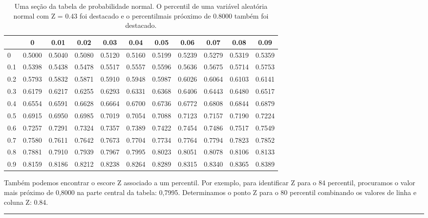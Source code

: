 \documentclass[
]{book}
\theoremstyle{definition}
\theoremstyle{definition}
\theoremstyle{definition}
\theoremstyle{definition}
\theoremstyle{remark}
\begin{document}
\begin{table}

\caption{\label{tab:zTableShort}Uma seção da tabela de probabilidade normal. O percentil de uma  variável  aleatória  normal com Z =  0.43  foi destacado e o percentilmais próoximo de 0.8000 também foi destacado.}
\centering
\begin{tabular}[t]{l|c|c|c|c|c|c|c|c|c|c}
\hline
  & 0 & 0.01 & 0.02 & 0.03 & 0.04 & 0.05 & 0.06 & 0.07 & 0.08 & 0.09\\
\hline
0 & 0.5000 & 0.5040 & 0.5080 & 0.5120 & 0.5160 & 0.5199 & 0.5239 & 0.5279 & 0.5319 & 0.5359\\
\hline
0.1 & 0.5398 & 0.5438 & 0.5478 & 0.5517 & 0.5557 & 0.5596 & 0.5636 & 0.5675 & 0.5714 & 0.5753\\
\hline
0.2 & 0.5793 & 0.5832 & 0.5871 & 0.5910 & 0.5948 & 0.5987 & 0.6026 & 0.6064 & 0.6103 & 0.6141\\
\hline
0.3 & 0.6179 & 0.6217 & 0.6255 & 0.6293 & 0.6331 & 0.6368 & 0.6406 & 0.6443 & 0.6480 & 0.6517\\
\hline
0.4 & 0.6554 & 0.6591 & 0.6628 & 0.6664 & 0.6700 & 0.6736 & 0.6772 & 0.6808 & 0.6844 & 0.6879\\
\hline
0.5 & 0.6915 & 0.6950 & 0.6985 & 0.7019 & 0.7054 & 0.7088 & 0.7123 & 0.7157 & 0.7190 & 0.7224\\
\hline
0.6 & 0.7257 & 0.7291 & 0.7324 & 0.7357 & 0.7389 & 0.7422 & 0.7454 & 0.7486 & 0.7517 & 0.7549\\
\hline
0.7 & 0.7580 & 0.7611 & 0.7642 & 0.7673 & 0.7704 & 0.7734 & 0.7764 & 0.7794 & 0.7823 & 0.7852\\
\hline
0.8 & 0.7881 & 0.7910 & 0.7939 & 0.7967 & 0.7995 & 0.8023 & 0.8051 & 0.8078 & 0.8106 & 0.8133\\
\hline
0.9 & 0.8159 & 0.8186 & 0.8212 & 0.8238 & 0.8264 & 0.8289 & 0.8315 & 0.8340 & 0.8365 & 0.8389\\
\hline
\end{tabular}
\end{table}

Também podemos encontrar o escore Z associado a um percentil. Por exemplo, para identificar Z para o 84 percentil, procuramos o valor mais próximo de 0,8000 na parte central da tabela: 0,7995. Determinamos o ponto Z para o 80 percentil combinando os valores de linha e coluna Z: 0.84.

\begin{center}\rule{0.5\linewidth}{0.5pt}\end{center}
\end{document}
